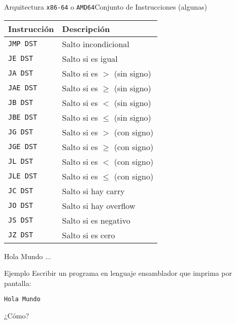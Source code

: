 \documentclass[aspectratio=169]{beamer}
\begin{document}
\begin{frame}[fragile]{Arquitectura \texttt{x86-64} o \texttt{AMD64}}{Conjunto de Instrucciones (algunas)}
    \begin{tabular}{p{2.7cm}|p{10cm}}
    Instrucción & Descripción \\ \hline
    \texttt{JMP DST}  & \textcolor{verdeuca}{Salto incondicional          }\\
    \texttt{JE DST}   & \textcolor{verdeuca}{Salto si es igual            }\\ %
    \hline
    \texttt{JA  DST} & \textcolor{verdeuca}{Salto si es $>$ (sin signo)   }\\ %
    \texttt{JAE DST} & \textcolor{verdeuca}{Salto si es $\ge$ (sin signo) }\\ %
    \texttt{JB  DST} & \textcolor{verdeuca}{Salto si es $<$ (sin signo)   }\\ %
    \texttt{JBE DST} & \textcolor{verdeuca}{Salto si es $\le$ (sin signo) }\\ %
    \hline
    \texttt{JG  DST} & \textcolor{verdeuca}{Salto si es $>$ (con signo)   }\\ %
    \texttt{JGE DST} & \textcolor{verdeuca}{Salto si es $\ge$ (con signo) }\\ %
    \texttt{JL  DST} & \textcolor{verdeuca}{Salto si es $<$ (con signo)   }\\ %
    \texttt{JLE DST} & \textcolor{verdeuca}{Salto si es $\le$ (con signo) }\\ %
    \hline
    \texttt{JC  DST} & \textcolor{verdeuca}{Salto si hay carry            }\\ %
    \texttt{JO  DST} & \textcolor{verdeuca}{Salto si hay overflow         }\\ %
    \texttt{JS  DST} & \textcolor{verdeuca}{Salto si es negativo          }\\ %
    \texttt{JZ  DST} & \textcolor{verdeuca}{Salto si es cero              }\\ %
    \end{tabular}
\end{frame}

\begin{frame}[t]{Hola Mundo ...}
    \begin{block}{Ejemplo}
    Escribir un programa en lenguaje ensamblador que imprima por pantalla:\\
    \begin{center}
    \Large
    \texttt{Hola Mundo}
    \end{center}
    \vspace{.2cm}
    \end{block}
    \vspace{0.7cm}
    \pause
    \begin{center}
    \Huge ¿Cómo?
    \end{center}
\end{frame}
\end{document}
